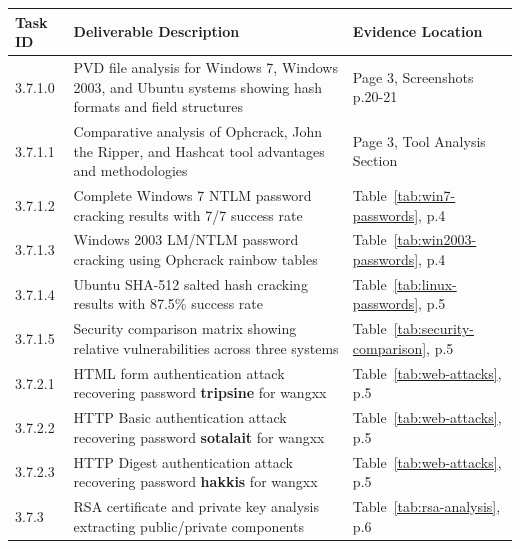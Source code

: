 \label{tab:traceability}
{\small
\begin{longtable}{@{}C{1.8cm}L{7cm}L{4.5cm}@{}}
\toprule
\textbf{Task ID} & \textbf{Deliverable Description} & \textbf{Evidence Location} \\
\midrule
\endhead

3.7.1.0 & PVD file analysis for Windows 7, Windows 2003, and Ubuntu systems showing hash formats and field structures & Page 3, Screenshots p.20-21 \\

3.7.1.1 & Comparative analysis of Ophcrack, John the Ripper, and Hashcat tool advantages and methodologies & Page 3, Tool Analysis Section \\

3.7.1.2 & Complete Windows 7 NTLM password cracking results with 7/7 success rate & Table~\ref{tab:win7-passwords}, p.4 \\

3.7.1.3 & Windows 2003 LM/NTLM password cracking using Ophcrack rainbow tables & Table~\ref{tab:win2003-passwords}, p.4 \\

3.7.1.4 & Ubuntu SHA-512 salted hash cracking results with 87.5\% success rate & Table~\ref{tab:linux-passwords}, p.5 \\

3.7.1.5 & Security comparison matrix showing relative vulnerabilities across three systems & Table~\ref{tab:security-comparison}, p.5 \\

3.7.2.1 & HTML form authentication attack recovering password \textbf{tripsine} for wangxx & Table~\ref{tab:web-attacks}, p.5 \\

3.7.2.2 & HTTP Basic authentication attack recovering password \textbf{sotalait} for wangxx & Table~\ref{tab:web-attacks}, p.5 \\

3.7.2.3 & HTTP Digest authentication attack recovering password \textbf{hakkis} for wangxx & Table~\ref{tab:web-attacks}, p.5 \\

3.7.3 & RSA certificate and private key analysis extracting public/private components & Table~\ref{tab:rsa-analysis}, p.6 \\

\bottomrule
\end{longtable}
}